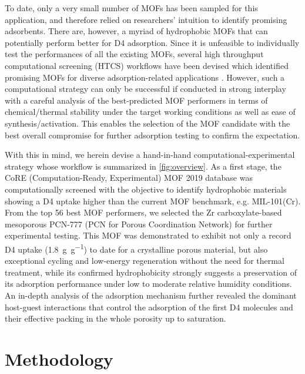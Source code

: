 To date, only a very small number of MOFs has been sampled for this application,
and therefore relied on researchers' intuition to identify promising adsorbents.
There are, however, a myriad of hydrophobic MOFs that can potentially perform
better for D4 adsorption. Since it is unfeasible to individually test the
performances of all the existing MOFs, several high throughput computational
screening (HTCS) workflows have been devised which identified promising MOFs for
diverse adsorption-related applications \citep{simonWhatAreBest2015,
parkEstablishingUpperBounds2017, moghadamComputeraidedDiscoveryMetal2018,
boydDatadrivenDesignMetal2019, shiMachineLearningSilico2020,
yaoInverseDesignNanoporous2021}. However, such a computational strategy can only
be successful if conducted in strong interplay with a careful analysis of the
best-predicted MOF performers in terms of chemical/thermal stability under the
target working conditions as well as ease of synthesis/activation. This enables
the selection of the MOF candidate with the best overall compromise for further
adsorption testing to confirm the expectation.

With this in mind, we herein devise a hand-in-hand computational-experimental
strategy whose workflow is summarized in \cref{fig:overview}. As a first stage,
the CoRE (Computation-Ready, Experimental) MOF 2019 database
\citep{chungAdvancesUpdatesAnalytics2019} was computationally screened with the
objective to identify hydrophobic materials showing a D4 uptake higher than the
current MOF benchmark, e.g. MIL-101(Cr). From the top 56 best MOF performers, we
selected the Zr carboxylate-based mesoporous PCN-777 (PCN for Porous
Coordination Network) for further experimental testing. This MOF was
demonstrated to exhibit not only a record D4 uptake (\SI{1.8}{\gram\per\gram})
to date for a crystalline porous material, but also exceptional cycling and
low-energy regeneration without the need for thermal treatment, while its
confirmed hydrophobicity strongly suggests a preservation of its adsorption
performance under low to moderate relative humidity conditions. An in-depth
analysis of the adsorption mechanism further revealed the dominant host-guest
interactions that control the adsorption of the first D4 molecules and their
effective packing in the whole porosity up to saturation.

\section{Methodology}\label{methodology}

